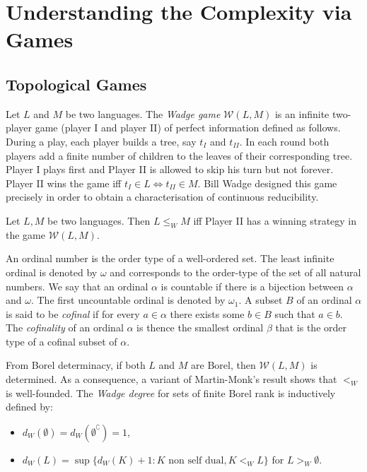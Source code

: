 \section{Understanding the Complexity via Games}

\subsection{Topological Games}
Let $L$ and $M$ be two languages. The {\em Wadge game}
$\mathcal{W}(L, M)$ is an infinite two-player game (player I and player II) of perfect information defined as follows. During a play,
each player builds a tree, say $t_{I}$ and $t_{II}$. 
In each round both players add a finite number of children to the leaves
of their corresponding tree. Player I plays first and Player II is allowed to
skip his turn but not forever.  Player II wins the game iff $t_{I} \in L
\Leftrightarrow t_{II} \in M$.  Bill Wadge designed this game precisely in order
to obtain a characterisation of continuous reducibility.
\begin{lemma}
Let $L, M$ be two languages. Then  $L \leq_W M$ iff Player II has a winning strategy in the game $\mathcal{W}(L, M)$.
\end{lemma}

An ordinal number is the order type of a well-ordered set. 
The least infinite ordinal is denoted by $\omega$ and corresponds to the order-type of the set of all natural numbers. We say that an ordinal $\alpha$ is countable if there is a bijection between $\alpha$ and $\omega$. The first uncountable ordinal is denoted by $\omega_1$.
A subset $B$ of an ordinal $\alpha$ is said to be \emph{cofinal} if 
for every $a \in \alpha$ there exists some $b \in B$ such that $a \in b$.
The \emph{cofinality} of an ordinal $\alpha$ is thence the smallest ordinal $\beta$ that is the order type of a cofinal subset of $\alpha$.

  From Borel determinacy,
if both $L$ and $M$ are Borel, then $\mathcal{W}(L, M)$ is determined.
As a consequence, a variant of Martin-Monk's result shows that $<_W$ is
well-founded. The \emph{Wadge degree} for sets of finite Borel rank is
inductively defined by:
\begin{itemize}
\item $d_W(\emptyset)=d_W(\emptyset^\complement)=1$,
\item $d_W(L)=\sup\{d_W(K)+1\colon K \text{ non self dual}, K <_WL\}$ for $L>_W\emptyset$.
\end{itemize}

